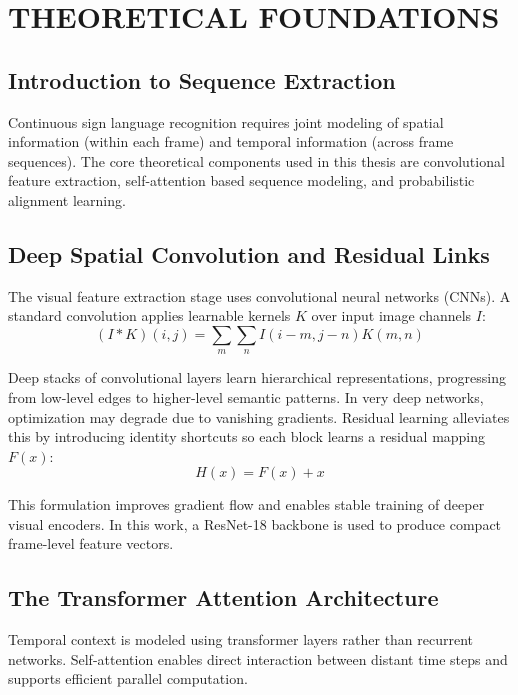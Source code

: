 \chapter{THEORETICAL FOUNDATIONS}

\section{Introduction to Sequence Extraction}

Continuous sign language recognition requires joint modeling of spatial information (within each frame) and temporal information (across frame sequences). The core theoretical components used in this thesis are convolutional feature extraction, self-attention based sequence modeling, and probabilistic alignment learning.

\section{Deep Spatial Convolution and Residual Links}

The visual feature extraction stage uses convolutional neural networks (CNNs). A standard convolution applies learnable kernels $K$ over input image channels $I$:
\begin{equation}
(I * K)(i,j) = \sum_m \sum_n I(i-m, j-n) K(m,n)
\end{equation}

Deep stacks of convolutional layers learn hierarchical representations, progressing from low-level edges to higher-level semantic patterns. In very deep networks, optimization may degrade due to vanishing gradients. Residual learning alleviates this by introducing identity shortcuts so each block learns a residual mapping $F(x)$:
\begin{equation}
H(x) = F(x) + x
\end{equation}

This formulation improves gradient flow and enables stable training of deeper visual encoders. In this work, a ResNet-18 backbone is used to produce compact frame-level feature vectors.

\section{The Transformer Attention Architecture}

Temporal context is modeled using transformer layers rather than recurrent networks. Self-attention enables direct interaction between distant time steps and supports efficient parallel computation.

